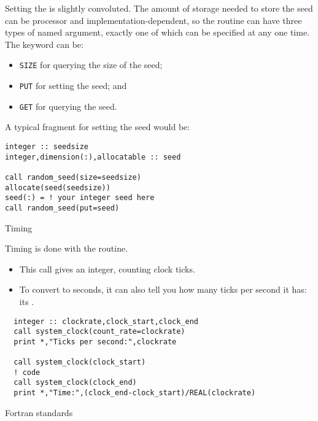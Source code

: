 Setting the  is slightly convoluted. The
amount of storage needed to store the seed can be processor and
implementation-dependent, so the routine 
can have three types of named argument, exactly one of which can be
specified at any one time. The keyword can be:
\begin{itemize}
\item \lstinline{SIZE} for querying the size of the seed;
\item \lstinline{PUT} for setting the seed; and
\item \lstinline{GET} for querying the seed.
\end{itemize}
A typical fragment for setting the seed would be:
\begin{lstlisting}
integer :: seedsize
integer,dimension(:),allocatable :: seed

call random_seed(size=seedsize)
allocate(seed(seedsize))
seed(:) = ! your integer seed here
call random_seed(put=seed)
\end{lstlisting}

 {Timing}

Timing is done with the  routine.
\begin{itemize}
\item This call gives an integer, counting clock ticks.
\item To convert to seconds, it can also tell you how many ticks per
  second it has: its .
\end{itemize}

\begin{lstlisting}
  integer :: clockrate,clock_start,clock_end
  call system_clock(count_rate=clockrate)
  print *,"Ticks per second:",clockrate

  call system_clock(clock_start)
  ! code
  call system_clock(clock_end)
  print *,"Time:",(clock_end-clock_start)/REAL(clockrate)
\end{lstlisting}

 {Fortran standards}

